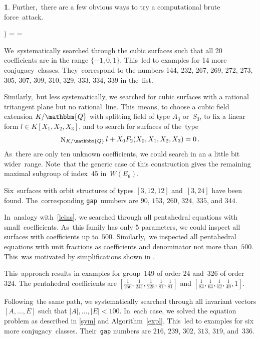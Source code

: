 \documentclass[reqno]{amsart}
\theoremstyle{definition}
\newtheorem{ttt}[theorem]{}
\theoremstyle{remark}
\numberwithin{equation}{section}
\newcommand{\bbQ}{\mathbbm{Q}}
\newcommand{\N}{\mathop{\rm N}\nolimits}
\newcounter{iii}
\newenvironment{iii}{\begin{list}{\rm \roman{iii}) }%
{\usecounter{iii} \leftmargin=0.0pt \labelsep=0.0pt %
\listparindent=0.0pt \labelwidth=0.0pt \parsep=\smallskipamount%
 \itemsep=0.0pt \topsep=0.0pt \partopsep=\smallskipamount}}{\end{list}}
\begin{document}
\begin{ttt}\smallskip
Further,~there are a few obvious ways to try a computational brute force~attack.

\begin{iii}
\item
\label{leins}
We~systematically searched through the cubic surfaces such that all 20 coefficients are in the range
$\{-1,0,1\}$.
This~led to examples for 14 more conjugacy~classes. They~correspond to the numbers
144, 232, 267, 269, 272, 273, 305, 307, 309, 310, 329, 333, 334, 339 in the~list.
\item
Similarly,~but less systematically, we searched for cubic surfaces with a rational tritangent
plane but no rational~line. This~means, to choose a cubic field extension
$K/\bbQ$
with splitting field of type
$A_3$
or~$S_3$,
to fix a linear form
$l \in K[X_1, X_2, X_3]$,
and to search for surfaces of the~type
$$\N_{K/\bbQ} l + X_0 F_2 (X_0, X_1, X_2, X_3) = 0 \, .$$
As~there are only ten unknown coefficients, we could search in an a little bit wider~range. Note~that the generic case of this construction gives the remaining maximal subgroup of
index~$45$
in~$W(E_6)$.

Six~surfaces with orbit structures of types
$[3,12,12]$
and~$[3,24]$
have been found. The~corresponding {\tt gap}~numbers are
$90$,
$153$,
$260$,
$324$,
$335$,
and
$344$.
\item
In~analogy with~\ref{leins}, we searched through all pentahedral equations with small~coefficients. As~this family has only 5 parameters, we could inspect all surfaces with coefficients up
to~$500$.
Similarly,~we inspected all pentahedral equations with unit fractions as coefficients and denominator not more
than~$500$.
This~was motivated by simplifications shown in \cite[Fact~2.8]{EJ1b}.

This~approach results in examples for group \textnumero\,149 of order
$24$
and \textnumero\,326 of
order~$324$.
The pentahedral coefficients are
$[\frac1{256}, \frac1{241}, \frac1{225}, \frac1{81}, \frac1{81}]$
and
$[\frac1{84}, \frac1{64}, \frac1{52}, \frac1{49}, 1]$.
\item
Following~the same path, we systematically searched through all invariant vectors
$[A, \ldots, E]$
such that
$|A|, \ldots, |E| < 100$.
In~each case, we solved the equation problem as described in \ref{sym} and Algorithm~\ref{expl}.
This~led to examples for six more conjugacy~classes. Their~{\tt gap} numbers are
$216$,
$239$,
$302$,
$313$,
$319$,
and~$336$.
\end{iii}
\end{ttt}
\end{document}
